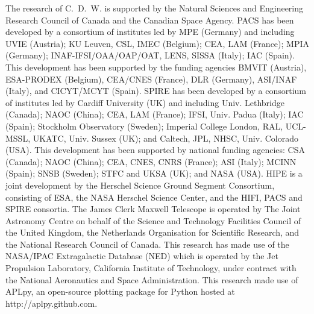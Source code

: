 \documentclass[preprint2]{aastex}
\begin{document}


\acknowledgments
The research of C.~D.~W. is supported by the Natural Sciences and Engineering Research Council of Canada and the Canadian Space Agency.  PACS has been developed by a consortium of institutes led by MPE (Germany) and including UVIE (Austria); KU Leuven, CSL, IMEC (Belgium); CEA, LAM (France); MPIA (Germany); INAF-IFSI/OAA/OAP/OAT, LENS, SISSA (Italy); IAC (Spain). This development has been supported by the funding agencies BMVIT (Austria), ESA-PRODEX (Belgium), CEA/CNES (France), DLR (Germany), ASI/INAF (Italy), and CICYT/MCYT (Spain).  SPIRE has been developed by a consortium of institutes led by Cardiff University (UK) and including Univ. Lethbridge (Canada); NAOC (China); CEA, LAM (France); IFSI, Univ. Padua (Italy); IAC (Spain); Stockholm Observatory (Sweden); Imperial College London, RAL, UCL-MSSL, UKATC, Univ. Sussex (UK); and Caltech, JPL, NHSC, Univ. Colorado (USA). This development has been supported by national funding agencies: CSA (Canada); NAOC (China); CEA, CNES, CNRS (France); ASI (Italy); MCINN (Spain); SNSB (Sweden); STFC and UKSA (UK); and NASA (USA).  HIPE is a joint development by the Herschel Science Ground Segment Consortium, consisting of ESA, the NASA Herschel Science Center, and the HIFI, PACS and SPIRE consortia.  The James Clerk Maxwell Telescope is operated by The Joint Astronomy Centre on behalf of the Science and Technology Facilities Council of the United Kingdom, the Netherlands Organisation for Scientific Research, and the National Research Council of Canada. This research has made use of the NASA/IPAC Extragalactic Database (NED) which is operated by the Jet Propulsion Laboratory, California Institute of Technology, under contract with the National Aeronautics and Space Administration.  This research made use of APLpy, an open-source plotting package for Python hosted at http://aplpy.github.com.

\end{document}
